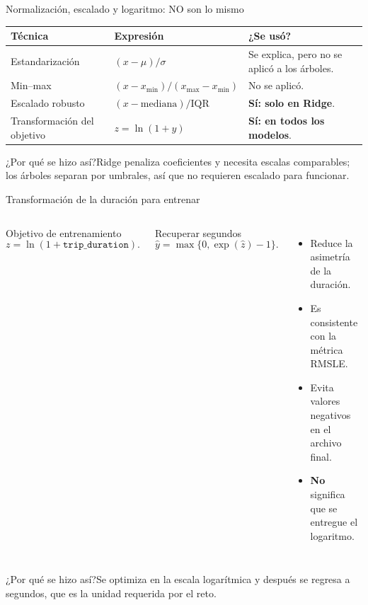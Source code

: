 \documentclass[aspectratio=169,11pt]{beamer}
\newcommand{\porq}[1]{\vspace{1.2mm}\begin{block}{¿Por qué se hizo así?}\small #1\end{block}}
\begin{document}
\begin{frame}{Normalización, escalado y logaritmo: NO son lo mismo}
\small
\begin{tabular}{p{.28\linewidth}p{.32\linewidth}p{.30\linewidth}}
\toprule
\textbf{Técnica} & \textbf{Expresión} & \textbf{¿Se usó?}\tabularnewline\midrule
Estandarización & $(x-\mu)/\sigma$ & Se explica, pero no se aplicó a los árboles.\\
Min--max & $(x-x_{\min})/(x_{\max}-x_{\min})$ & No se aplicó.\\
Escalado robusto & $(x-\mathrm{mediana})/\mathrm{IQR}$ & \textbf{Sí: solo en Ridge}.\\
Transformación del objetivo & $z=\ln(1+y)$ & \textbf{Sí: en todos los modelos}.\\
\bottomrule
\end{tabular}
\vspace{2mm}
\porq{Ridge penaliza coeficientes y necesita escalas comparables; los árboles separan por umbrales, así que no requieren escalado para funcionar.}
\end{frame}

\begin{frame}{Transformación de la duración para entrenar}
\begin{columns}[T]
\begin{block}{Objetivo de entrenamiento}
\[
 z=\ln(1+\texttt{trip\_duration}).
\]
\end{block}
\begin{block}{Recuperar segundos}
\[
 \widehat y=\max\{0,\exp(\widehat z)-1\}.
\]
\end{block}
\begin{itemize}
\item Reduce la asimetría de la duración.
\item Es consistente con la métrica RMSLE.
\item Evita valores negativos en el archivo final.
\item \textbf{No} significa que se entregue el logaritmo.
\end{itemize}
\end{columns}
\porq{Se optimiza en la escala logarítmica y después se regresa a segundos, que es la unidad requerida por el reto.}
\end{frame}
\end{document}
